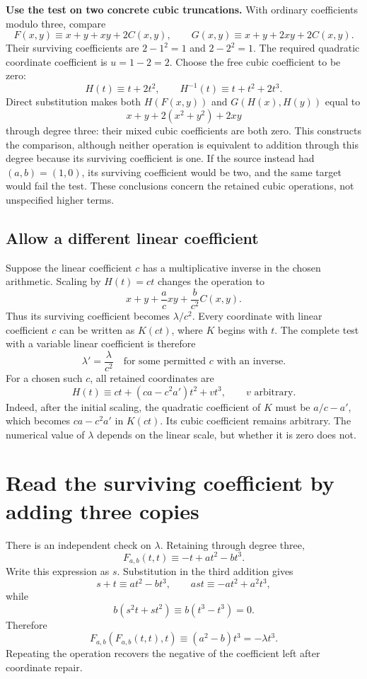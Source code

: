 \documentclass[11pt,letterpaper]{article}
\numberwithin{equation}{section}
\theoremstyle{definition}\newtheorem{example}[theorem]{Example}
\begin{document}
\textbf{Use the test on two concrete cubic truncations.} With ordinary coefficients modulo three, compare
\[
 F(x,y)\equiv x+y+xy+2C(x,y),\qquad
 G(x,y)\equiv x+y+2xy+2C(x,y).
\]
Their surviving coefficients are \(2-1^2=1\) and \(2-2^2=1\). The required quadratic coordinate coefficient is \(u=1-2=2\). Choose the free cubic coefficient to be zero:
\[
 H(t)\equiv t+2t^2,\qquad H^{-1}(t)\equiv t+t^2+2t^3.
\]
Direct substitution makes both \(H(F(x,y))\) and \(G(H(x),H(y))\) equal to
\[
 x+y+2(x^2+y^2)+2xy
\]
through degree three: their mixed cubic coefficients are both zero. This constructs the comparison, although neither operation is equivalent to addition through this degree because its surviving coefficient is one. If the source instead had \((a,b)=(1,0)\), its surviving coefficient would be two, and the same target would fail the test. These conclusions concern the retained cubic operations, not unspecified higher terms.

\subsection{Allow a different linear coefficient}

Suppose the linear coefficient \(c\) has a multiplicative inverse in the chosen arithmetic. Scaling by \(H(t)=ct\) changes the operation to
\[
 x+y+\frac acxy+\frac b{c^2}C(x,y).
\]
Thus its surviving coefficient becomes \(\lambda/c^2\). Every coordinate with linear coefficient \(c\) can be written as \(K(ct)\), where \(K\) begins with \(t\). The complete test with a variable linear coefficient is therefore
\begin{equation}\label{eq:nonstrict}
 \lambda'=\frac{\lambda}{c^2}
 \quad\text{for some permitted }c\text{ with an inverse}.
\end{equation}
For a chosen such \(c\), all retained coordinates are
\[
 H(t)\equiv ct+(ca-c^2a')t^2+vt^3,
 \qquad v\text{ arbitrary}.
\]
Indeed, after the initial scaling, the quadratic coefficient of \(K\) must be \(a/c-a'\), which becomes \(ca-c^2a'\) in \(K(ct)\). Its cubic coefficient remains arbitrary. The numerical value of \(\lambda\) depends on the linear scale, but whether it is zero does not.

\section{Read the surviving coefficient by adding three copies}\label{sec:three-series}

There is an independent check on \(\lambda\). Retaining through degree three,
\[
 F_{a,b}(t,t)\equiv-t+at^2-bt^3.
\]
Write this expression as \(s\). Substitution in the third addition gives
\[
 s+t\equiv at^2-bt^3,\qquad
 a st\equiv-at^2+a^2t^3,
\]
while
\[
 b(s^2t+st^2)\equiv b(t^3-t^3)=0.
\]
Therefore
\begin{equation}\label{eq:three-series}
 \boxed{\;F_{a,b}(F_{a,b}(t,t),t)
 \equiv(a^2-b)t^3=-\lambda t^3.\;}
\end{equation}
Repeating the operation recovers the negative of the coefficient left after coordinate repair.
\end{document}
